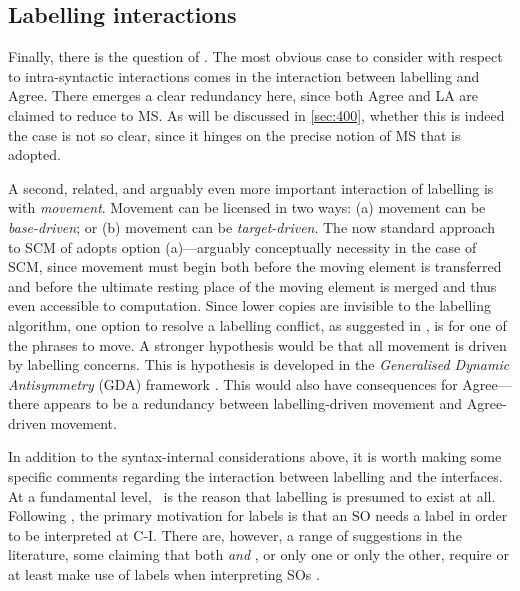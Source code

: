 \subsection{Labelling interactions}\label{sec:350}

Finally, there is the question of . The most obvious case to consider with respect to intra-syntactic interactions comes in the interaction between labelling and Agree. There emerges a clear redundancy here, since both Agree and LA are claimed to reduce to MS. As will be discussed in \autoref{sec:400}, whether this is indeed the case is not so clear, since it hinges on the precise notion of MS that is adopted.

A second, related, and arguably even more important interaction of labelling is with \emph{movement}. Movement can be licensed in two ways: (a) movement can be \textit{base-driven}; or (b) movement can be \textit{target-driven}. The now standard approach to SCM of \textcite{BoskovicZ_2007} adopts option (a)---arguably conceptually necessity in the case of SCM, since movement must begin both before the moving element is transferred and before the ultimate resting place of the moving element is merged and thus even accessible to computation. Since lower copies are invisible to the labelling algorithm, one option to resolve a labelling conflict, as suggested in , is for one of the phrases to move. A stronger hypothesis would be that all movement is driven by labelling concerns. This is hypothesis is developed in the \textit{Generalised Dynamic Antisymmetry} (GDA) framework \parencite{MoroA.RobertsI_2020}. This would also have consequences for Agree---there appears to be a redundancy between labelling-driven movement and Agree-driven movement.

In addition to the syntax-internal considerations above, it is worth making some specific comments regarding the interaction between labelling and the interfaces. At a fundamental level, \IC\ is the reason that labelling is presumed to exist at all. Following \textcite[et seq.]{ChomskyN_2004}, the primary motivation for labels is that an SO needs a label in order to be interpreted at C-I. There are, however, a range of suggestions in the literature, some claiming that both \ICSM \emph{and} \ICCI, or only one or only the other, require or at least make use of labels when interpreting SOs \parencite{BarrieM_2021,TakitaK_2020, TakitaK.etal_2016}.

